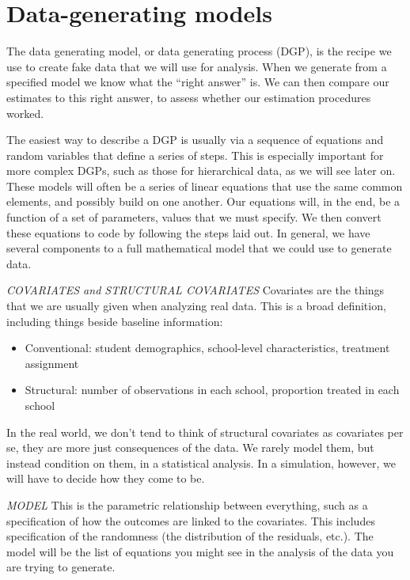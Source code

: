 \documentclass[
]{book}
\providecommand{\tightlist}{%
  \setlength{\itemsep}{0pt}\setlength{\parskip}{0pt}}
\begin{document}
\hypertarget{chap_DGP}{%
\chapter{Data-generating models}\label{chap_DGP}}

The data generating model, or data generating process (DGP), is the recipe we use to create fake data that we will use for analysis.
When we generate from a specified model we know what the ``right answer'' is.
We can then compare our estimates to this right answer, to assess whether our estimation procedures worked.

The easiest way to describe a DGP is usually via a sequence of equations and random variables that define a series of steps.
This is especially important for more complex DGPs, such as those for hierarchical data, as we will see later on.
These models will often be a series of linear equations that use the same common elements, and possibly build on one another.
Our equations will, in the end, be a function of a set of parameters, values that we must specify.
We then convert these equations to code by following the steps laid out.
In general, we have several components to a full mathematical model that we could use to generate data.

\emph{COVARIATES and STRUCTURAL COVARIATES}
Covariates are the things that we are usually given when analyzing real data.
This is a broad definition, including things beside baseline information:

\begin{itemize}
\tightlist
\item
  Conventional: student demographics, school-level characteristics, treatment assignment
\item
  Structural: number of observations in each school, proportion treated in each school
\end{itemize}

In the real world, we don't tend to think of structural covariates as covariates per se, they are more just consequences of the data.
We rarely model them, but instead condition on them, in a statistical analysis.
In a simulation, however, we will have to decide how they come to be.

\emph{MODEL}
This is the parametric relationship between everything, such as a specification of how the outcomes are linked to the covariates.
This includes specification of the randomness (the distribution of the residuals, etc.).
The model will be the list of equations you might see in the analysis of the data you are trying to generate.
\end{document}

